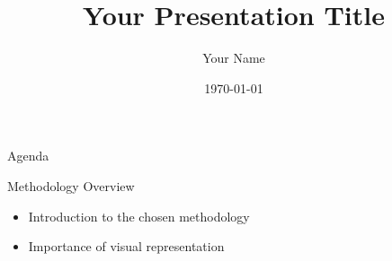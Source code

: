 \documentclass{beamer}
\title{Your Presentation Title}
\author{Your Name}
\date{\today}
\begin{document}
\begin{frame}
    \titlepage
\end{frame}

\begin{frame}{Agenda}
    \tableofcontents
\end{frame}


\begin{frame}{Methodology Overview}
    \begin{itemize}
        \item Introduction to the chosen methodology
        \item Importance of visual representation
    \end{itemize}
\end{frame}
\end{document}
